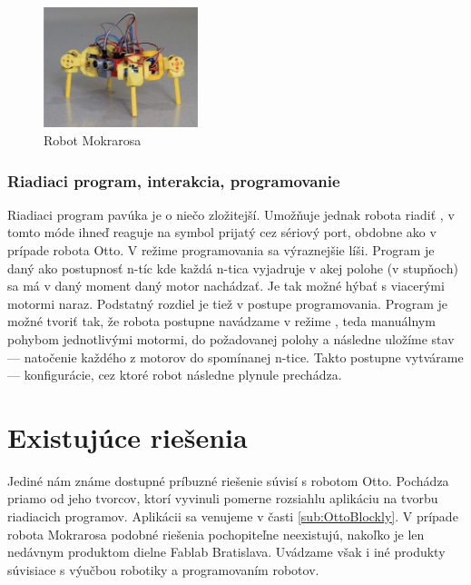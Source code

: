 \begin{figure}
\centerline{\includegraphics[width=0.4\textwidth]{images/mokrarosa}}
\caption[Robot Mokrarosa]{Robot Mokrarosa}
\label{obr:mokrarosa}
\end{figure}

\subsubsection{Riadiaci program, interakcia, programovanie}
Riadiaci program pavúka je o niečo zložitejší. Umožňuje jednak robota riadiť , v tomto móde ihneď reaguje na symbol prijatý cez sériový port, obdobne ako v prípade robota Otto. V režime programovania sa výraznejšie líši. Program je daný ako postupnosť n-tíc kde každá n-tica vyjadruje v akej polohe (v stupňoch) sa má v daný moment daný motor nachádzať. Je tak možné hýbať s viacerými motormi naraz. Podstatný rozdiel je tiež v postupe programovania. Program je možné tvoriť tak, že robota postupne navádzame v režime , teda manuálnym pohybom jednotlivými motormi, do požadovanej polohy a následne uložíme stav --- natočenie každého z motorov do spomínanej n-tice. Takto postupne vytvárame  --- konfigurácie, cez ktoré robot následne plynule prechádza.


\section{Existujúce riešenia}
Jediné nám známe dostupné príbuzné riešenie súvisí s robotom Otto. Pochádza priamo od jeho tvorcov, ktorí vyvinuli pomerne rozsiahlu aplikáciu na tvorbu  riadiacich programov. Aplikácii sa venujeme v časti \ref{sub:OttoBlockly}. V prípade robota Mokrarosa podobné riešenia pochopiteľne neexistujú, nakoľko je len nedávnym produktom dielne Fablab Bratislava. Uvádzame však i iné produkty súvisiace s výučbou robotiky a programovaním robotov.

